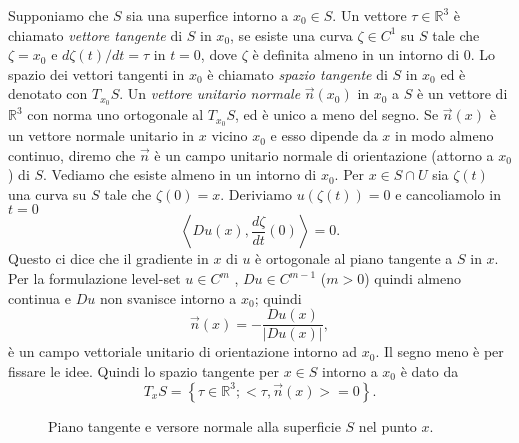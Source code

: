 Supponiamo che $S$ sia una superfice intorno a $x_0\in S$. Un vettore $\tau\in\mathbb{R}^3$ è chiamato \emph{vettore tangente} di $S$ in $x_0$, se esiste una curva $\zeta\in C^1$ su $S$ tale che $\zeta = x_0$ e $d\zeta(t)/dt = \tau$ in $t=0$, dove $\zeta$ è definita almeno in un intorno di $0$. Lo spazio dei vettori tangenti in $x_0$ è chiamato \emph{spazio tangente} di $S$ in $x_0$ ed è denotato con $T_{x_0}S$. Un \emph{vettore unitario normale} $\vec{n}(x_0)$ in $x_0$ a $S$ è un vettore di $\mathbb{R}^3$ con norma uno ortogonale al $T_{x_0}S$, ed è unico a meno del segno. Se $\vec{n}(x)$ è un vettore normale unitario in $x$ vicino $x_0$ e esso dipende da $x$ in modo almeno continuo, diremo che $\vec{n}$ è un campo unitario normale di orientazione (attorno a $x_0$) di $S$. Vediamo che esiste almeno in un intorno di $x_0$. Per $x\in S\cap U$ sia $\zeta(t)$ una curva su $S$ tale che $\zeta(0)=x$. Deriviamo $u(\zeta(t)) = 0$ e cancoliamolo in $t=0$
\[
\left<Du(x),\frac{d\zeta}{dt}(0)\right> = 0.
\]
Questo ci dice che il gradiente in $x$ di $u$ è ortogonale al piano tangente a $S$ in $x$. Per la formulazione level-set $u\in C^m$ , $Du\in C^{m-1}$ ($m>0$) quindi almeno continua e $Du$ non svanisce intorno a $x_0$; quindi
\[
\vec{n}(x)=-\frac{Du(x)}{|Du(x)|},
\]
è un campo vettoriale unitario di orientazione intorno ad $x_0$. Il segno meno è per fissare le idee. Quindi lo spazio tangente per $x\in S$ intorno a $x_0$ è dato da
\[
T_xS = \left\{\tau\in\mathbb{R}^3;<\tau,\vec{n}(x)>=0\right\}.
\]

\begin{figure}[!hp]

  \caption{Piano tangente e versore normale alla superficie $S$ nel punto $x$.}
  \label{fig:cp-111}
\end{figure}

